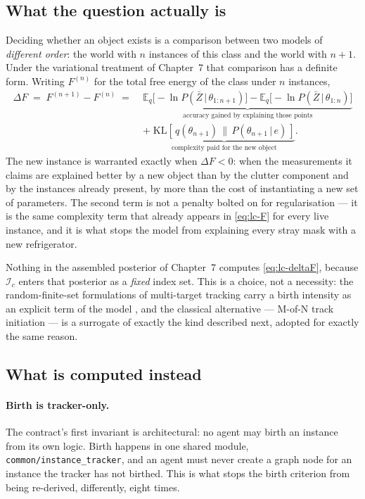 \documentclass[11pt,a4paper]{report}
\newcommand{\given}{\,|\,}
\begin{document}
\subsection{What the question actually is}

Deciding whether an object exists is a comparison between two models of \emph{different order}: the
world with $n$ instances of this class and the world with $n+1$. Under the variational treatment of
Chapter~7 that comparison has a definite form. Writing $F^{(n)}$ for the total free energy of the
class under $n$ instances,
\begin{align}
\Delta F \;=\; F^{(n+1)}-F^{(n)}
\;=\;&
\underbrace{\mathbb{E}_{q}\big[-\ln P(\bar Z\given\theta_{1:n+1})\big]
          -\mathbb{E}_{q}\big[-\ln P(\bar Z\given\theta_{1:n})\big]}_{\text{accuracy gained by explaining those points}}
\nonumber\\[4pt]
&+\;
\underbrace{\mathrm{KL}\!\left[\,q(\theta_{n+1})\,\|\,P(\theta_{n+1}\given e)\,\right]}_{\text{complexity paid for the new object}} .
\label{eq:lc-deltaF}
\end{align}
The new instance is warranted exactly when $\Delta F<0$: when the measurements it claims are
explained better by a new object than by the clutter component and by the instances already present,
by more than the cost of instantiating a new set of parameters. The second term is not a penalty
bolted on for regularisation --- it is the same complexity term that already appears in
\eqref{eq:lc-F} for every live instance, and it is what stops the model from explaining every stray
mask with a new refrigerator.

Nothing in the assembled posterior of Chapter~7 computes \eqref{eq:lc-deltaF}, because
$\mathcal{I}_c$ enters that posterior as a \emph{fixed} index set. This is a choice, not a necessity:
the random-finite-set formulations of multi-target tracking carry a birth intensity as an explicit
term of the model \cite{mahler}, and the classical alternative --- M-of-N track initiation
\cite{barshalom} --- is a surrogate of exactly the kind described next, adopted for exactly the same
reason.

\subsection{What is computed instead}

\paragraph{Birth is tracker-only.} The contract's first invariant is architectural: no agent may
birth an instance from its own logic. Birth happens in one shared module,
\texttt{common/instance\_tracker}, and an agent must never create a graph node for an instance the
tracker has not birthed. This is what stops the birth criterion from being re-derived, differently,
eight times.
\end{document}
